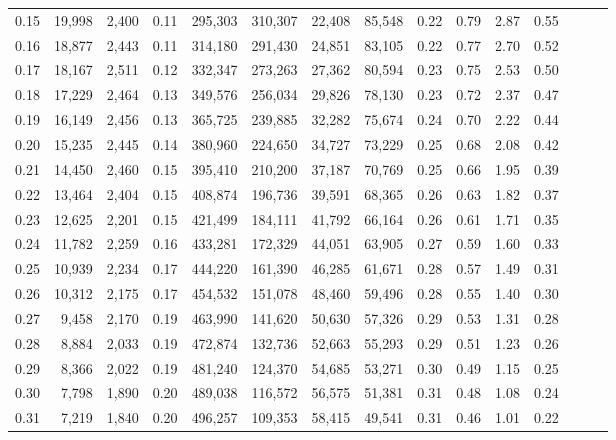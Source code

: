 \begin{tabular}{rrrrrrrrrrrrrrr}
0.15 &  19,998 &  2,400 &  0.11 &  295,303 &  310,307 &   22,408 &   85,548 &  0.22 &  0.79 &  2.87 &      0.55 \\
0.16 &  18,877 &  2,443 &  0.11 &  314,180 &  291,430 &   24,851 &   83,105 &  0.22 &  0.77 &  2.70 &      0.52 \\
0.17 &  18,167 &  2,511 &  0.12 &  332,347 &  273,263 &   27,362 &   80,594 &  0.23 &  0.75 &  2.53 &      0.50 \\
0.18 &  17,229 &  2,464 &  0.13 &  349,576 &  256,034 &   29,826 &   78,130 &  0.23 &  0.72 &  2.37 &      0.47 \\
0.19 &  16,149 &  2,456 &  0.13 &  365,725 &  239,885 &   32,282 &   75,674 &  0.24 &  0.70 &  2.22 &      0.44 \\
0.20 &  15,235 &  2,445 &  0.14 &  380,960 &  224,650 &   34,727 &   73,229 &  0.25 &  0.68 &  2.08 &      0.42 \\
0.21 &  14,450 &  2,460 &  0.15 &  395,410 &  210,200 &   37,187 &   70,769 &  0.25 &  0.66 &  1.95 &      0.39 \\
0.22 &  13,464 &  2,404 &  0.15 &  408,874 &  196,736 &   39,591 &   68,365 &  0.26 &  0.63 &  1.82 &      0.37 \\
0.23 &  12,625 &  2,201 &  0.15 &  421,499 &  184,111 &   41,792 &   66,164 &  0.26 &  0.61 &  1.71 &      0.35 \\
0.24 &  11,782 &  2,259 &  0.16 &  433,281 &  172,329 &   44,051 &   63,905 &  0.27 &  0.59 &  1.60 &      0.33 \\
0.25 &  10,939 &  2,234 &  0.17 &  444,220 &  161,390 &   46,285 &   61,671 &  0.28 &  0.57 &  1.49 &      0.31 \\
0.26 &  10,312 &  2,175 &  0.17 &  454,532 &  151,078 &   48,460 &   59,496 &  0.28 &  0.55 &  1.40 &      0.30 \\
0.27 &   9,458 &  2,170 &  0.19 &  463,990 &  141,620 &   50,630 &   57,326 &  0.29 &  0.53 &  1.31 &      0.28 \\
0.28 &   8,884 &  2,033 &  0.19 &  472,874 &  132,736 &   52,663 &   55,293 &  0.29 &  0.51 &  1.23 &      0.26 \\
0.29 &   8,366 &  2,022 &  0.19 &  481,240 &  124,370 &   54,685 &   53,271 &  0.30 &  0.49 &  1.15 &      0.25 \\
0.30 &   7,798 &  1,890 &  0.20 &  489,038 &  116,572 &   56,575 &   51,381 &  0.31 &  0.48 &  1.08 &      0.24 \\
0.31 &   7,219 &  1,840 &  0.20 &  496,257 &  109,353 &   58,415 &   49,541 &  0.31 &  0.46 &  1.01 &      0.22 \\

\end{tabular}
